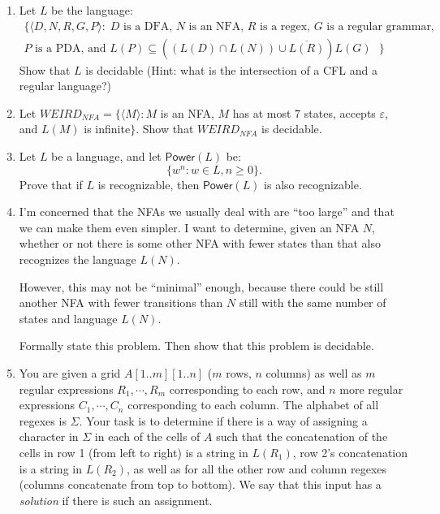 \begin{enumerate}[resume]
	
\item {} Let $L$ be the language:
\begin{align*}
\{ \langle D, N, R, G, P \rangle :\;\text{$D$ is a DFA, $N$ is an NFA, $R$ is a regex, $G$ is a regular grammar,}\\
\text{$P$ is a PDA, and $L(P) \subseteq ((L(D) \cap L(N)) \cup \overline{L(R)}) L(G)$ }   \}
\end{align*}
Show that $L$ is decidable (Hint: what is the intersection of a CFL and a regular language?)

\item {} Let $WEIRD_{NFA} = \{ \langle M \rangle : M$ is an NFA, $M$ has at most 7 states, accepts $\varepsilon$, and $L(M)$ is infinite$\}$.
Show that $WEIRD_{NFA}$ is decidable.

\item {} Let $L$ be a language, and let $\textsf{Power}(L)$ be:
\[
\{ w^n : w \in L, n \ge 0 \}.
\]
Prove that if $L$ is recognizable, then $\textsf{Power}(L)$ is also recognizable.

\item {} I'm concerned that the NFAs we usually deal with are ``too large'' and that we can make them even simpler. I want to determine, given an NFA $N$, whether or not there is some other NFA with fewer states than that also recognizes the language $L(N)$. 

However, this may not be ``minimal'' enough, because there could be still another NFA with fewer transitions than $N$ still with the same number of states and language $L(N)$. 

Formally state this problem. Then show that this problem is decidable.

\item \label{regex_crossword}  You are given a grid $A[1..m][1..n]$ ($m$ rows, $n$ columns) as well as $m$ regular expressions $R_1, \cdots, R_m$ corresponding to each row, and $n$ more regular expressions $C_1, \cdots, C_n$ corresponding to each column. The alphabet of all regexes is $\Sigma$. Your task is to determine if there is a way of assigning a character in $\Sigma$ in each of the cells of $A$ such that the concatenation of the cells in row 1 (from left to right) is a string in $L(R_1)$, row 2's concatenation is a string in $L(R_2)$, as well as for all the other row and column regexes (columns concatenate from top to bottom). We say that this input has a \emph{solution} if there is such an assignment. 


\end{enumerate}
